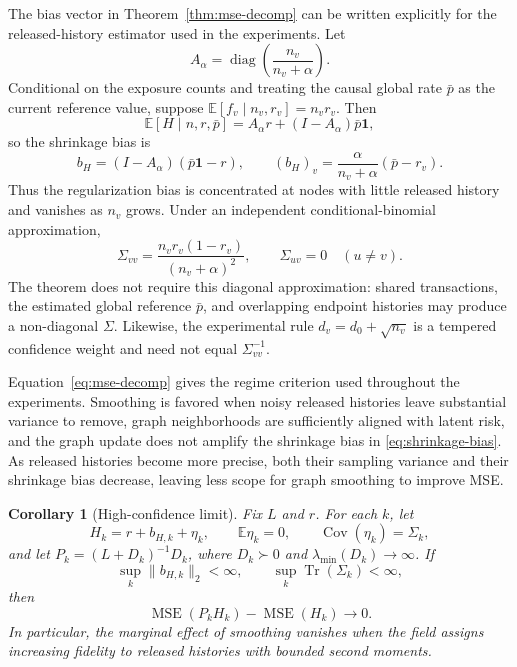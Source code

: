 \documentclass[11pt]{article}
\newtheorem{corollary}[theorem]{Corollary}
\theoremstyle{definition}
\theoremstyle{remark}
\newcommand{\one}{\mathbf{1}}
\newcommand{\diag}{\operatorname{diag}}
\newcommand{\E}{\mathbb{E}}
\newcommand{\Cov}{\operatorname{Cov}}
\newcommand{\Tr}{\operatorname{Tr}}
\begin{document}
The bias vector in Theorem~\ref{thm:mse-decomp} can be written explicitly for the released-history estimator used in the experiments. Let
\[
    A_\alpha=\diag\!\left(\frac{n_v}{n_v+\alpha}\right).
\]
Conditional on the exposure counts and treating the causal global rate $\bar p$ as the current reference value, suppose $\E[f_v\mid n_v,r_v]=n_vr_v$. Then
\[
    \E[H\mid n,r,\bar p]
    =A_\alpha r+(I-A_\alpha)\bar p\one,
\]
so the shrinkage bias is
\begin{equation}
    b_H=(I-A_\alpha)(\bar p\one-r),
    \qquad
    (b_H)_v=\frac{\alpha}{n_v+\alpha}(\bar p-r_v).
    \label{eq:shrinkage-bias}
\end{equation}
Thus the regularization bias is concentrated at nodes with little released history and vanishes as $n_v$ grows. Under an independent conditional-binomial approximation,
\begin{equation}
    \Sigma_{vv}=\frac{n_vr_v(1-r_v)}{(n_v+\alpha)^2},
    \qquad
    \Sigma_{uv}=0\quad(u\ne v).
    \label{eq:shrinkage-cov}
\end{equation}
The theorem does not require this diagonal approximation: shared transactions, the estimated global reference $\bar p$, and overlapping endpoint histories may produce a non-diagonal $\Sigma$. Likewise, the experimental rule $d_v=d_0+\sqrt{n_v}$ is a tempered confidence weight and need not equal $\Sigma_{vv}^{-1}$.

Equation~\eqref{eq:mse-decomp} gives the regime criterion used throughout the experiments. Smoothing is favored when noisy released histories leave substantial variance to remove, graph neighborhoods are sufficiently aligned with latent risk, and the graph update does not amplify the shrinkage bias in \eqref{eq:shrinkage-bias}. As released histories become more precise, both their sampling variance and their shrinkage bias decrease, leaving less scope for graph smoothing to improve MSE.

\begin{corollary}[High-confidence limit]
\label{cor:high-confidence}
Fix $L$ and $r$. For each $k$, let
\[
    H_k=r+b_{H,k}+\eta_k,
    \qquad \E\eta_k=0,
    \qquad \Cov(\eta_k)=\Sigma_k,
\]
and let $P_k=(L+D_k)^{-1}D_k$, where $D_k\succ0$ and $\lambda_{\min}(D_k)\to\infty$. If
\[
    \sup_k\|b_{H,k}\|_2<\infty,
    \qquad
    \sup_k\Tr(\Sigma_k)<\infty,
\]
then
\[
    \operatorname{MSE}(P_kH_k)-\operatorname{MSE}(H_k)\longrightarrow0.
\]
In particular, the marginal effect of smoothing vanishes when the field assigns increasing fidelity to released histories with bounded second moments.
\end{corollary}
\end{document}
